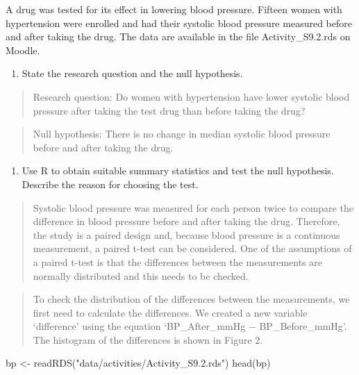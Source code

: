 \documentclass[
]{memoir}
\newenvironment{Shaded}{\begin{snugshade}}{\end{snugshade}}
\newcommand{\FunctionTok}[1]{\textcolor[rgb]{0.00,0.00,0.00}{#1}}
\newcommand{\NormalTok}[1]{#1}
\newcommand{\OtherTok}[1]{\textcolor[rgb]{0.56,0.35,0.01}{#1}}
\newcommand{\StringTok}[1]{\textcolor[rgb]{0.31,0.60,0.02}{#1}}
\providecommand{\tightlist}{%
  \setlength{\itemsep}{0pt}\setlength{\parskip}{0pt}}
\begin{document}
A drug was tested for its effect in lowering blood pressure. Fifteen women with hypertension were enrolled and had their systolic blood pressure measured before and after taking the drug. The data are available in the file Activity\_S9.2.rds on Moodle.

\begin{enumerate}
\def\labelenumi{\alph{enumi})}
\tightlist
\item
  State the research question and the null hypothesis.
\end{enumerate}

\begin{quote}
Research question: Do women with hypertension have lower systolic blood pressure after taking the test drug than before taking the drug?
\end{quote}

\begin{quote}
Null hypothesis: There is no change in median systolic blood pressure before and after taking the drug.
\end{quote}

\begin{enumerate}
\def\labelenumi{\alph{enumi})}
\setcounter{enumi}{1}
\tightlist
\item
  Use R to obtain suitable summary statistics and test the null hypothesis. Describe the reason for choosing the test.
\end{enumerate}

\begin{quote}
Systolic blood pressure was measured for each person twice to compare the difference in blood pressure before and after taking the drug. Therefore, the study is a paired design and, because blood pressure is a continuous measurement, a paired t-test can be considered. One of the assumptions of a paired t-test is that the differences between the measurements are normally distributed and this needs to be checked.
\end{quote}

\begin{quote}
To check the distribution of the differences between the measurements, we first need to calculate the differences. We created a new variable `difference' using the equation `BP\_After\_mmHg − BP\_Before\_mmHg'. The histogram of the differences is shown in Figure 2.
\end{quote}

\begin{Shaded}
\begin{Highlighting}[]
\NormalTok{bp }\OtherTok{\textless{}{-}} \FunctionTok{readRDS}\NormalTok{(}\StringTok{"data/activities/Activity\_S9.2.rds"}\NormalTok{)}
\FunctionTok{head}\NormalTok{(bp)}
\end{Highlighting}
\end{Shaded}
\end{document}
